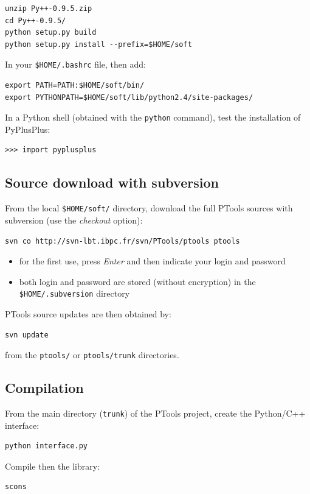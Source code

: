 \documentclass[12pt,a4paper]{article}
\begin{document}
\begin{verbatim}
unzip Py++-0.9.5.zip 
cd Py++-0.9.5/
python setup.py build
python setup.py install --prefix=$HOME/soft
\end{verbatim}

In your {\tt \$HOME/.bashrc} file, then add:
\begin{verbatim}
export PATH=PATH:$HOME/soft/bin/
export PYTHONPATH=$HOME/soft/lib/python2.4/site-packages/
\end{verbatim}

In a Python shell (obtained with the {\tt python} command), test the installation
of PyPlusPlus:
\begin{verbatim}
>>> import pyplusplus
\end{verbatim}

\subsection{Source download with subversion}

From the local {\tt \$HOME/soft/} directory, download the full PTools sources with subversion (use the {\it checkout} option):
\begin{verbatim}
svn co http://svn-lbt.ibpc.fr/svn/PTools/ptools ptools
\end{verbatim}

\begin{itemize}
\item for the first use, press {\it Enter} and then indicate your login and password
\item both login and password are stored (without encryption) in the {\tt \$HOME/.subversion} directory
\end{itemize}

PTools source updates are then obtained by:
\begin{verbatim}
svn update
\end{verbatim}
from the {\tt ptools/} or {\tt ptools/trunk} directories.


\subsection{Compilation}
From the main directory ({\tt trunk}) of the PTools project, create the Python/C++ interface:
\begin{verbatim}
python interface.py
\end{verbatim}

Compile then the library:
\begin{verbatim}
scons
\end{verbatim}
\end{document}
